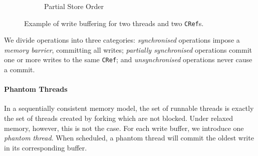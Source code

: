 \begin{figure}
\begin{subfigure}{0.3\textwidth}
    \caption{Partial Store Order}
  \end{subfigure}
  \caption{Example of write buffering for two threads and two \texttt{CRef}s.}
  \label{fig:wb}
\end{figure}

We divide operations into three categories: \emph{synchronised}
operations impose a \emph{memory barrier}, committing all writes;
\emph{partially synchronised} operations commit one or more writes to
the same \verb|CRef|; and \emph{unsynchronised} operations never cause
a commit.

\paragraph{Phantom Threads}
In a sequentially consistent memory model, the set of runnable threads is
exactly the set of threads created by forking which are not blocked.  Under
relaxed memory, however, this is not the case.  For each write buffer, we
introduce one \emph{phantom thread}.  When scheduled, a phantom thread will
commit the oldest write in its corresponding buffer.

